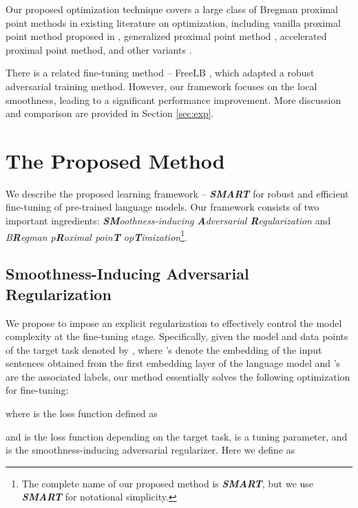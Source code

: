 \documentclass[11pt]{article} \usepackage{url}
\begin{document}
Our proposed optimization technique covers a large  class of Bregman proximal point methods in existing literature on optimization, including vanilla proximal point method proposed in \citet{rockafellar1976monotone}, generalized proximal point method \cite{teboulle1997convergence,eckstein1993nonlinear}, accelerated proximal point method, and other variants \citep{guler1991convergence,guler1992new,parikh2014proximal}. 

There is a related fine-tuning method -- FreeLB \citet{zhu2019freelb}, which adapted a robust adversarial training method. However, our framework focuses on the local smoothness, leading to a significant performance improvement. More discussion and comparison are provided in Section \ref{sec:exp}. 
%
 \vspace{-0.05in}
\section{The Proposed Method}
\label{sec:method}
\vspace{-0.05in}

We describe the proposed learning framework -- \textit{\textbf{SMART}} for robust and efficient fine-tuning of pre-trained language models. Our framework consists of two important ingredients: \textit{\textbf{SM}oothness-inducing \textbf{A}dversarial \textbf{R}egularization} and \textit{B\textbf{R}egman p\textbf{R}oximal poin\textbf{T} op\textbf{T}imization}\footnote{The complete name of our proposed method is \textit{\textbf{SMART}}, but we use \textit{\textbf{SMART}} for notational simplicity.}. 

\vspace{-0.05in}
\subsection{Smoothness-Inducing Adversarial Regularization}\label{sec:regularization}


We propose to impose an explicit regularization to effectively control the model complexity at the fine-tuning stage. Specifically, given the model  and  data points of the target task denoted by , where 's denote the embedding of the input sentences obtained from the first embedding layer of the language model and 's are the associated labels, our method essentially solves the following optimization for fine-tuning:

where  is the loss function defined as

and  is the loss function depending on the target task,  is a tuning parameter, and  is the smoothness-inducing adversarial regularizer. Here we define  as
\end{document}
